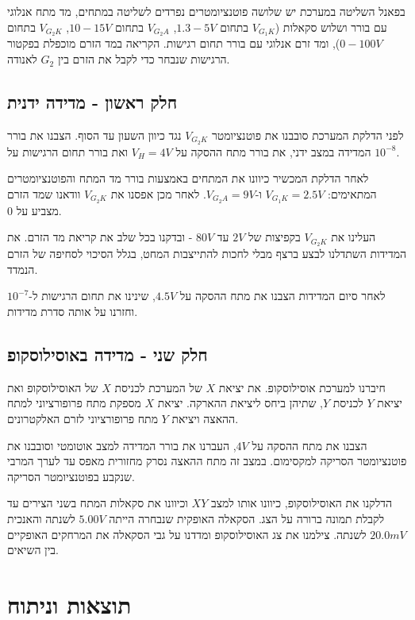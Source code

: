 \documentclass[14pt]{extarticle}
\begin{document}
בפאנל השליטה במערכת יש שלושה פוטנציומטרים נפרדים לשליטה במתחים, מד מתח אנלוגי עם בורר ושלוש סקאלות
($V_{G_1K}$ בתחום $1.3-5V$, $V_{G_2A}$ בתחום $10-15V$, $V_{G_2K}$ בתחום $0-100V$), ומד זרם
אנלוגי עם בורר תחום רגישות. הקריאה במד הזרם מוכפלת בפקטור הרגישות שנבחר כדי לקבל את הזרם
בין $G_2$ לאנודה.

\subsection*{חלק ראשון - מדידה ידנית}

לפני הדלקת המערכת סובבנו את פוטנציומטר $V_{G_2K}$ נגד כיוון השעון עד הסוף. הצבנו את בורר
המדידה במצב ידני, את בורר מתח ההסקה על $V_H = 4V$ ואת בורר תחום הרגישות על $10^{-8}$.

לאחר הדלקת המכשיר כיוונו את המתחים באמצעות בורר מד המתח והפוטנציומטרים המתאימים:
$V_{G_1K} = 2.5V$ ו-$V_{G_2A} = 9V$. לאחר מכן אפסנו את $V_{G_2K}$ וודאנו שמד הזרם מצביע על 0.

העלינו את $V_{G_2K}$ בקפיצות של $2V$ עד $80V$ - ובדקנו בכל שלב את
קריאת מד הזרם. את המדידות השתדלנו לבצע ברצף מבלי לחכות להתייצבות המחט, בגלל הסיכוי לסחיפה של הזרם הנמדד.

לאחר סיום המדידות הצבנו את מתח ההסקה על $4.5V$, שינינו את תחום הרגישות ל-$10^{-7}$
וחזרנו על אותה סדרת מדידות.

\subsection*{חלק שני - מדידה באוסילוסקופ}

חיברנו למערכת אוסילוסקופ. את יציאת $X$
של המערכת לכניסת $X$ של האוסילוסקופ ואת יציאת $Y$ לכניסת $Y$, שתיהן ביחס ליציאת ההארקה.
יציאת $X$ מספקת מתח פרופורציוני למתח ההאצה ויציאת $Y$ מתח פרופורציוני לזרם האלקטרונים.

הצבנו את מתח ההסקה על $4V$, העברנו את בורר המדידה למצב אוטומטי וסובבנו את פוטנציומטר
הסריקה למקסימום. במצב זה מתח ההאצה נסרק מחזורית מאפס עד לערך המרבי שנקבע בפוטנציומטר הסריקה.

הדלקנו את האוסילוסקופ, כיוונו אותו למצב $XY$ וכיוונו את סקאלות המתח בשני הצירים עד לקבלת
תמונה ברורה על הצג. הסקאלה האופקית שנבחרה הייתה $5.00V$ לשנתה והאנכית $20.0mV$ לשנתה.
צילמנו את צג האוסילוסקופ ומדדנו על גבי הסקאלה את המרחקים האופקיים בין השיאים.

\section*{תוצאות וניתוח}
\end{document}
